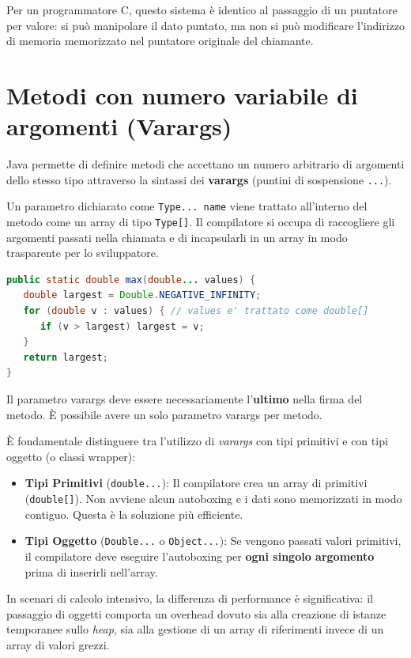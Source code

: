 \begin{observation}
    Per un programmatore C, questo sistema è identico al passaggio di un puntatore per valore: si può manipolare il dato puntato, ma non si può modificare l'indirizzo di memoria memorizzato nel puntatore originale del chiamante.
\end{observation}



\section{Metodi con numero variabile di argomenti (Varargs)}

Java permette di definire metodi che accettano un numero arbitrario di argomenti dello stesso tipo attraverso la sintassi dei \textbf{varargs} (puntini di sospensione \texttt{...}).

Un parametro dichiarato come \texttt{Type... name} viene trattato all'interno del metodo come un array di tipo \texttt{Type[]}. Il compilatore si occupa di raccogliere gli argomenti passati nella chiamata e di incapsularli in un array in modo trasparente per lo sviluppatore.

\begin{lstlisting}[language=Java, caption={Esempio di funzione max con varargs}]
public static double max(double... values) {
   double largest = Double.NEGATIVE_INFINITY;
   for (double v : values) { // values e' trattato come double[]
      if (v > largest) largest = v;
   }
   return largest;
}
\end{lstlisting}

\begin{warningbox}[]
    Il parametro varargs deve essere necessariamente l'\textbf{ultimo} nella firma del metodo. È possibile avere un solo parametro varargs per metodo.
\end{warningbox}

\begin{observation}
    È fondamentale distinguere tra l'utilizzo di \textit{varargs} con tipi primitivi e con tipi oggetto (o classi wrapper):
    \begin{itemize}
        \item \textbf{Tipi Primitivi} (\texttt{double...}): Il compilatore crea un array di primitivi (\texttt{double[]}). Non avviene alcun autoboxing e i dati sono memorizzati in modo contiguo. Questa è la soluzione più efficiente.
        \item \textbf{Tipi Oggetto} (\texttt{Double...} o \texttt{Object...}): Se vengono passati valori primitivi, il compilatore deve eseguire l'autoboxing per \textbf{ogni singolo argomento} prima di inserirli nell'array. 
    \end{itemize}
    In scenari di calcolo intensivo, la differenza di performance è significativa: il passaggio di oggetti comporta un overhead dovuto sia alla creazione di istanze temporanee sullo \textit{heap}, sia alla gestione di un array di riferimenti invece di un array di valori grezzi.
\end{observation}

